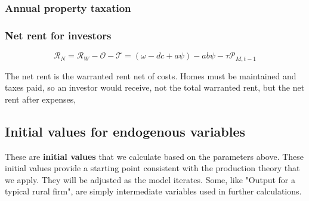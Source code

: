 \subsubsection{Annual property taxation}

\subsubsection{Net rent for investors} {\color{green}}
\[\mathcal{R}_N = \mathcal{R}_W - \mathcal{O} - \mathcal{T}= (\omega - {dc} + a\psi )- a b \psi - \tau  \mathcal{P}_{M, t-1}\]

The \gls{net rent} is the warranted rent net of costs. Homes must be maintained and taxes paid, so an investor would receive, not the total warranted rent, but the net rent after expenses,

\subsection{Initial values for endogenous variables} \label{sec-init-value-list}

These are \textbf{initial values} that we calculate based on the parameters above. These initial values provide  a starting point consistent with the production theory that we apply. They will be adjusted as the model iterates.  Some, like "Output for a typical rural firm", are simply intermediate variables used in further calculations.%



